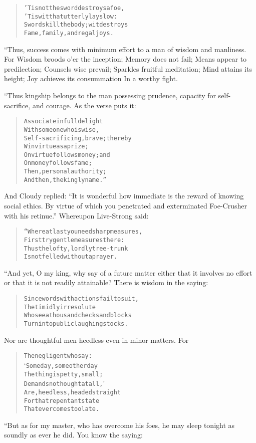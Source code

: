 \documentclass[article, twoside, 14pt]{memoir}
\renewenvironment{verbatim}{%
\begin{quote}%
\vskip -10pt%
\begin{alltt}\normalfont\large}{\end{alltt}%
\end{quote}%
\vskip -10pt
} %
\begin{document}
\begin{verbatim}
'Tis not the sword destroys a foe,
'Tis wit that utterly lays low:
Swords kill the body; wit destroys
Fame, family, and regal joys.
\end{verbatim}
“Thus, success comes with minimum effort to a man of wisdom and
manliness. For Wisdom broods o'er the inception; Memory does not
fail; Means appear to predilection; Counsels wise prevail; Sparkles
fruitful meditation; Mind attains its height; Joy achieves its
consummation In a worthy fight.

“Thus kingship belongs to the man possessing prudence, capacity for
self-sacrifice, and courage. As the verse puts it:

\begin{verbatim}
Associate in full delight
    With someone who is wise,
Self-sacrificing, brave; thereby
    Win virtue as a prize;
On virtue follows money; and
    On money follows fame;
Then, personal authority;
    And then, the kingly name.”
\end{verbatim}
And Cloudy replied:
``It is wonderful how immediate is the reward of knowing social ethics. By virtue of which you penetrated and exterminated Foe-Crusher with his retinue.''
Whereupon Live-Strong said:

\begin{verbatim}
“Where at last you need sharp measures,
    First try gentle measures there:
Thus the lofty, lordly tree-trunk
    Is not felled without a prayer.
\end{verbatim}
“And yet, O my king, why say of a future matter either that it
involves no effort or that it is not readily attainable? There is
wisdom in the saying:

\begin{verbatim}
Since words with actions fail to suit,
The timidly irresolute
Who see a thousand checks and blocks
Turn into public laughingstocks.
\end{verbatim}
Nor are thoughtful men heedless even in minor matters. For

\begin{verbatim}
The negligent who say:
‘Some day, some other day{\textemdash}
The thing is petty, small;
Demands no thought at all,’
Are, heedless, headed straight
For that repentant state
That ever comes too late.
\end{verbatim}
“But as for my master, who has overcome his foes, he may sleep
tonight as soundly as ever he did. You know the saying:
\end{document}
